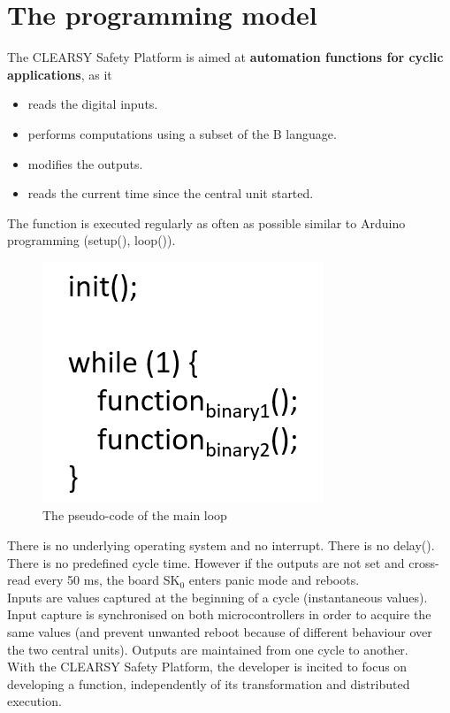 \section{The programming model}

The CLEARSY Safety Platform is aimed at \textbf{automation functions for cyclic applications}, as it 
\begin{itemize}
    \item reads the digital inputs.
    \item performs computations using a subset of the B language.
    \item modifies the outputs.
    \item reads the current time since the central unit started.
\end{itemize}
The function is executed regularly as often as possible similar to Arduino programming (setup(), loop()). 
  \begin{figure}[ht]
\centering\includegraphics[scale=0.3]{Pictures/chapterProgramming/main-loop-pseudo-code.png}
\caption{The pseudo-code of the main loop}
\end{figure}  
There is no underlying operating system and no interrupt. 
There is no delay(). There is no predefined cycle time. However if the outputs are not set and cross-read every 50 ms, the board SK$_0$ enters panic mode and reboots.\\
Inputs are values captured at the beginning of a cycle (instantaneous values). Input capture is synchronised on both microcontrollers in order to acquire the same values (and prevent unwanted reboot because of different behaviour over the two central units). Outputs are maintained from one cycle to another.\\

With the CLEARSY Safety Platform, the developer is incited to focus on developing a function, independently of its transformation and distributed execution. 

